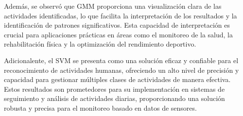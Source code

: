 \documentclass{esannV2}
\begin{document}
Además, se observó que GMM proporciona una visualización clara de las actividades identificadas, lo que facilita la interpretación de los resultados y la identificación de patrones significativos. Esta capacidad de interpretación es crucial para aplicaciones prácticas en áreas como el monitoreo de la salud, la rehabilitación física y la optimización del rendimiento deportivo.

Adicionalente, el SVM se presenta como una solución eficaz y confiable para el reconocimiento de actividades humanas, ofreciendo un alto nivel de precisión y capacidad para gestionar múltiples clases de actividades de manera efectiva. Estos resultados son prometedores para su implementación en sistemas de seguimiento y análisis de actividades diarias, proporcionando una solución robusta y precisa para el monitoreo basado en datos de sensores.



\begin{footnotesize}









%
%

\end{footnotesize}

\end{document}
